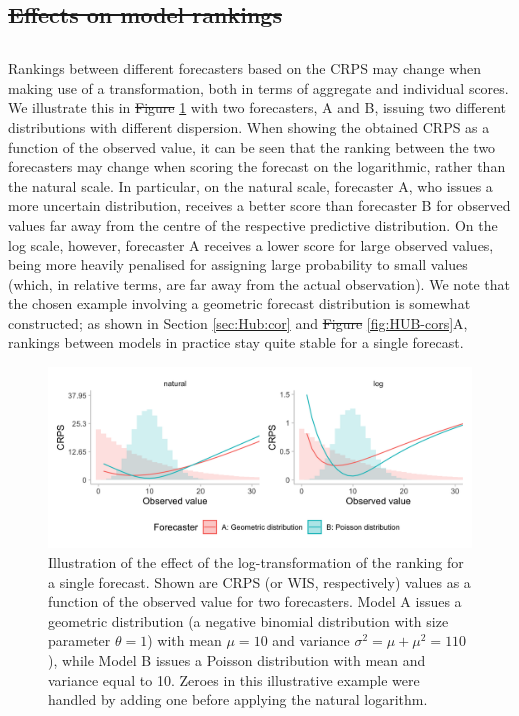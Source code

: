 \documentclass[10pt,letterpaper]{article} %
\providecommand{\DIFaddtex}[1]{{\protect\color{blue}\uwave{#1}}} %
\providecommand{\DIFdeltex}[1]{{\protect\color{red}\sout{#1}}}                      %
\providecommand{\DIFaddbegin}{} %
\providecommand{\DIFaddend}{} %
\providecommand{\DIFdelbegin}{} %
\providecommand{\DIFdelend}{} %
\providecommand{\DIFadd}[1]{\texorpdfstring{\DIFaddtex{#1}}{#1}} %
\providecommand{\DIFdel}[1]{\texorpdfstring{\DIFdeltex{#1}}{}} %
\newcommand{\DIFscaledelfig}{0.5}
\newlength{\DIFdelgraphicswidth} %
\newlength{\DIFdelgraphicsheight} %
\newcommand{\DIFaddincludegraphics}[2][]{{\color{blue}\fbox{\DIFOincludegraphics[#1]{#2}}}} %
\newcommand{\DIFdelincludegraphics}[2][]{%
\sbox{\DIFdelgraphicsbox}{\DIFOincludegraphics[#1]{#2}}%
\settoboxwidth{\DIFdelgraphicswidth}{\DIFdelgraphicsbox} %
\settoboxtotalheight{\DIFdelgraphicsheight}{\DIFdelgraphicsbox} %
\scalebox{\DIFscaledelfig}{%
\parbox[b]{\DIFdelgraphicswidth}{\usebox{\DIFdelgraphicsbox}\\[-\baselineskip] \rule{\DIFdelgraphicswidth}{0em}}\llap{\resizebox{\DIFdelgraphicswidth}{\DIFdelgraphicsheight}{%
\setlength{\unitlength}{\DIFdelgraphicswidth}%
\begin{picture}(1,1)%
\thicklines\linethickness{2pt} %
{\color[rgb]{1,0,0}\put(0,0){\framebox(1,1){}}}%
{\color[rgb]{1,0,0}\put(0,0){\line( 1,1){1}}}%
{\color[rgb]{1,0,0}\put(0,1){\line(1,-1){1}}}%
\end{picture}%
}\hspace*{3pt}}} %
} %
\DeclareRobustCommand{\DIFaddbegin}{\DIFOaddbegin \let\includegraphics\DIFaddincludegraphics} %
\DeclareRobustCommand{\DIFaddend}{\DIFOaddend \let\includegraphics\DIFOincludegraphics} %
\DeclareRobustCommand{\DIFdelbegin}{\DIFOdelbegin \let\includegraphics\DIFdelincludegraphics} %
\DeclareRobustCommand{\DIFdelend}{\DIFOaddend \let\includegraphics\DIFOincludegraphics} %
\begin{document}
\DIFdelbegin \subsection{\DIFdel{Effects on model rankings}}
\addtocounter{subsection}{-1}%
\DIFdelend \DIFaddbegin \subsection*{\DIFadd{Effects on model rankings}}
\DIFaddend \label{sec:methods:rankings}
Rankings between different forecasters based on the CRPS may change when making use of a transformation, both in terms of aggregate and individual scores. We illustrate this in \DIFdelbegin \DIFdel{Figure }\DIFdelend \DIFaddbegin \DIFadd{Fig }\DIFaddend \ref{fig:illustration-ranking} with two forecasters, A and B, issuing two different distributions with different dispersion. When showing the obtained CRPS as a function of the observed value, it can be seen that the ranking between the two forecasters may change when scoring the forecast on the logarithmic, rather than the natural scale. In particular, on the natural scale, forecaster A, who issues a more uncertain distribution, receives a better score than forecaster B for observed values far away from the centre of the respective predictive distribution. On the log scale, however, forecaster A receives a lower score for large observed values, being more heavily penalised for assigning large probability to small values (which, in relative terms, are far away from the actual observation). We note that the chosen example involving a geometric forecast distribution is somewhat constructed; as shown in Section \ref{sec:Hub:cor} and \DIFdelbegin \DIFdel{Figure }\DIFdelend \DIFaddbegin \DIFadd{Fig }\DIFaddend \ref{fig:HUB-cors}A, rankings between models in practice stay quite stable for a single forecast. 


\begin{figure}[h!]
\centering
\includegraphics[width = 1\textwidth]{../output/figures/illustration-effect-log-ranking-crps.png}
\caption{Illustration of the effect of the log-transformation of the ranking for a single forecast. Shown are CRPS (or WIS, respectively) values as a function of the observed value for two forecasters. Model A issues a geometric distribution (a negative binomial distribution with size parameter $\theta = 1$) with mean $\mu = 10$ and variance $\sigma^2 = \mu + \mu^2 = 110$), while Model B issues a Poisson distribution with mean and variance equal to 10. Zeroes in this illustrative example were handled by adding one before applying the natural logarithm.}
\label{fig:illustration-ranking}
\end{figure}
\end{document}
